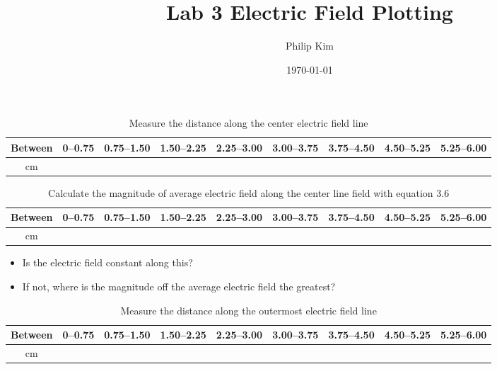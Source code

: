 \documentclass{article}
\title{Lab 3 Electric Field Plotting}
\author{Philip Kim}
\date{\today}
\begin{document}
\maketitle

\begin{table}[h!]
  \begin{center}
    \caption{Measure the distance along the center electric field line}\label{tab:table1}
    \begin{tabular}{|c|c|c|c|c|c|c|c|c|}\hline
      Between & 0--0.75 & 0.75--1.50 & 1.50--2.25 & 2.25--3.00 & 3.00--3.75 & 3.75--4.50 & 4.50--5.25 & 5.25--6.00 \\ \hline
      cm & & & & & & & & \\ \hline
    \end{tabular}
  \end{center}
\end{table}

\begin{table}[h!]
  \begin{center}
    \caption{Calculate the magnitude of average electric field along the center line field with equation 3.6}\label{tab:table1}
    \begin{tabular}{|c|c|c|c|c|c|c|c|c|}\hline
      Between & 0--0.75 & 0.75--1.50 & 1.50--2.25 & 2.25--3.00 & 3.00--3.75 & 3.75--4.50 & 4.50--5.25 & 5.25--6.00 \\ \hline
      cm & & & & & & & & \\ \hline
    \end{tabular}
  \end{center}
\end{table}
\begin{itemize}
  \item Is the electric field constant along this?
  \item If not, where is the magnitude off the average electric field the greatest?
\end{itemize}

\begin{table}[h!]
  \begin{center}
    \caption{Measure the distance along the outermost electric field line}\label{tab:table1}
    \begin{tabular}{|c|c|c|c|c|c|c|c|c|}\hline
      Between & 0--0.75 & 0.75--1.50 & 1.50--2.25 & 2.25--3.00 & 3.00--3.75 & 3.75--4.50 & 4.50--5.25 & 5.25--6.00 \\ \hline
      cm & & & & & & & & \\ \hline
    \end{tabular}
  \end{center}
\end{table}
\end{document}
